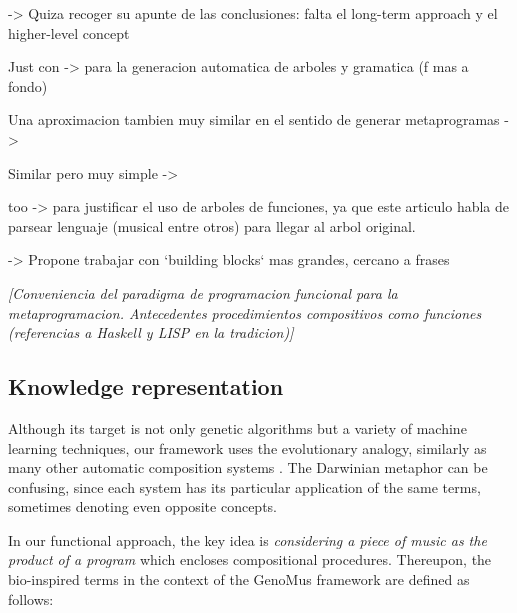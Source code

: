 \documentclass{article}
\begin{document}
{\color{red}




\cite{Herremans:2017:FTM:3145473.3108242} -> Quiza recoger su apunte de las conclusiones: falta el long-term approach y el higher-level concept 




Just con \cite{Drewes_analgebra} -> para la generacion automatica de arboles y gramatica (f mas a fondo)

Una aproximacion tambien muy similar en el sentido de generar metaprogramas -> \cite{Spector_inductionand}

Similar pero muy simple -> \cite{Ando}

too \cite{Bod_thedata-oriented} -> para justificar el uso de arboles de funciones, ya que este articulo habla de parsear lenguaje (musical entre otros) para llegar al arbol original.

}



 
{\color{red}

\cite{DBLP:conf/icmc/Jacob95} -> Propone trabajar con `building blocks` mas grandes, cercano a frases
}


{\color{gray} \textsl{[Conveniencia del paradigma de programacion funcional para la metaprogramacion. Antecedentes procedimientos compositivos como funciones (referencias a Haskell y LISP en la tradicion)]}}





\subsection{Knowledge representation}
Although its target is not only genetic algorithms but a variety of machine learning techniques, our framework uses the evolutionary analogy, similarly as many other automatic composition systems \cite{Sulyok2019, SnchezQuintana2013, add more...}. The Darwinian metaphor can be confusing, since each system has its particular application of the same terms, sometimes denoting even opposite concepts. 

In our functional approach, the key idea is \emph{considering a piece of music as the product of a program} which encloses compositional procedures. Thereupon, the bio-inspired terms in the context of the GenoMus framework are defined as follows: 
\end{document}
